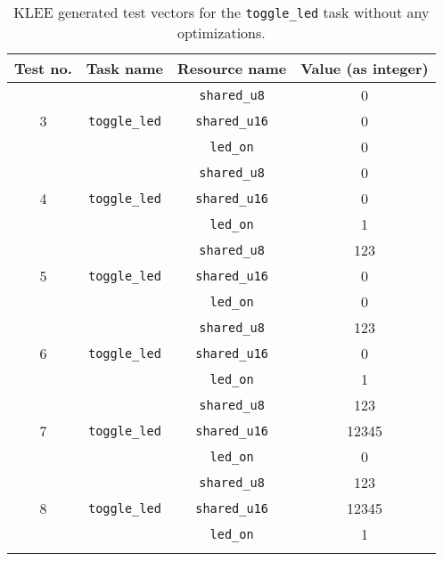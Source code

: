 \begin{longtable}{|c|c|c|c|}
\hline
Test no. & Task name & Resource name & Value (as integer) \\ \hline
\multirow{3}{*}{3} & \multirow{3}{*}{\texttt{toggle\_led}} & \texttt{shared\_u8}  & 0 \\ \cline{3-4} 
                   &                                       & \texttt{shared\_u16} & 0 \\ \cline{3-4} 
                   &                                       & \texttt{led\_on}     & 0 \\ \hline
\multirow{3}{*}{4} & \multirow{3}{*}{\texttt{toggle\_led}} & \texttt{shared\_u8}  & 0 \\ \cline{3-4} 
                   &                                       & \texttt{shared\_u16} & 0 \\ \cline{3-4} 
                   &                                       & \texttt{led\_on}     & 1 \\ \hline
\multirow{3}{*}{5} & \multirow{3}{*}{\texttt{toggle\_led}} & \texttt{shared\_u8}  & 123 \\ \cline{3-4} 
                   &                                       & \texttt{shared\_u16} & 0 \\ \cline{3-4} 
                   &                                       & \texttt{led\_on}     & 0 \\ \hline
\multirow{3}{*}{6} & \multirow{3}{*}{\texttt{toggle\_led}} & \texttt{shared\_u8}  & 123 \\ \cline{3-4} 
                   &                                       & \texttt{shared\_u16} & 0 \\ \cline{3-4} 
                   &                                       & \texttt{led\_on}     & 1 \\ \hline
\multirow{3}{*}{7} & \multirow{3}{*}{\texttt{toggle\_led}} & \texttt{shared\_u8}  & 123 \\ \cline{3-4} 
                   &                                       & \texttt{shared\_u16} & 12345 \\ \cline{3-4} 
                   &                                       & \texttt{led\_on}     & 0 \\ \hline
\multirow{3}{*}{8} & \multirow{3}{*}{\texttt{toggle\_led}} & \texttt{shared\_u8}  & 123 \\ \cline{3-4} 
                   &                                       & \texttt{shared\_u16} & 12345 \\ \cline{3-4} 
                   &                                       & \texttt{led\_on}      & 1 \\ \hline
\caption{KLEE generated test vectors for the \texttt{toggle\_led} task without any optimizations.}
\label{tab:evaldebugteststoggle}
\end{longtable}

